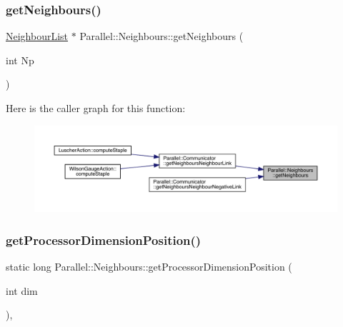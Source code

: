 \subsubsection{\texorpdfstring{getNeighbours()}{getNeighbours()}}
{\footnotesize\ttfamily \mbox{\hyperlink{struct_neighbour_list}{Neighbour\+List}} $\ast$ Parallel\+::\+Neighbours\+::get\+Neighbours (\begin{DoxyParamCaption}\item[{int}]{Np }\end{DoxyParamCaption})\hspace{0.3cm}{\ttfamily [static]}}

Here is the caller graph for this function\+:
\nopagebreak
\begin{figure}[H]
\begin{center}
\leavevmode
\includegraphics[width=350pt]{class_parallel_1_1_neighbours_a246afc374290bb0d3e86c07892872392_icgraph}
\end{center}
\end{figure}
\mbox{\label{class_parallel_1_1_neighbours_ad1a2a616b4089eded3545faf11409b85}} 
\subsubsection{\texorpdfstring{getProcessorDimensionPosition()}{getProcessorDimensionPosition()}}
{\footnotesize\ttfamily static long Parallel\+::\+Neighbours\+::get\+Processor\+Dimension\+Position (\begin{DoxyParamCaption}\item[{int}]{dim }\end{DoxyParamCaption})\hspace{0.3cm}{\ttfamily [inline]}, {\ttfamily [static]}}

